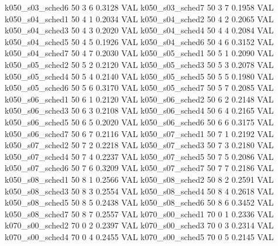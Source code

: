   k050_s03_sched6                   50    3   6    0.3128  VAL
  k050_s03_sched7                   50    3   7    0.1958  VAL
  k050_s04_sched1                   50    4   1    0.2034  VAL
  k050_s04_sched2                   50    4   2    0.2065  VAL
  k050_s04_sched3                   50    4   3    0.2020  VAL
  k050_s04_sched4                   50    4   4    0.2084  VAL
  k050_s04_sched5                   50    4   5    0.1926  VAL
  k050_s04_sched6                   50    4   6    0.3152  VAL
  k050_s04_sched7                   50    4   7    0.2030  VAL
  k050_s05_sched1                   50    5   1    0.2090  VAL
  k050_s05_sched2                   50    5   2    0.2120  VAL
  k050_s05_sched3                   50    5   3    0.2078  VAL
  k050_s05_sched4                   50    5   4    0.2140  VAL
  k050_s05_sched5                   50    5   5    0.1980  VAL
  k050_s05_sched6                   50    5   6    0.3170  VAL
  k050_s05_sched7                   50    5   7    0.2085  VAL
  k050_s06_sched1                   50    6   1    0.2120  VAL
  k050_s06_sched2                   50    6   2    0.2148  VAL
  k050_s06_sched3                   50    6   3    0.2108  VAL
  k050_s06_sched4                   50    6   4    0.2165  VAL
  k050_s06_sched5                   50    6   5    0.2020  VAL
  k050_s06_sched6                   50    6   6    0.3175  VAL
  k050_s06_sched7                   50    6   7    0.2116  VAL
  k050_s07_sched1                   50    7   1    0.2192  VAL
  k050_s07_sched2                   50    7   2    0.2218  VAL
  k050_s07_sched3                   50    7   3    0.2180  VAL
  k050_s07_sched4                   50    7   4    0.2237  VAL
  k050_s07_sched5                   50    7   5    0.2086  VAL
  k050_s07_sched6                   50    7   6    0.3209  VAL
  k050_s07_sched7                   50    7   7    0.2186  VAL
  k050_s08_sched1                   50    8   1    0.2566  VAL
  k050_s08_sched2                   50    8   2    0.2591  VAL
  k050_s08_sched3                   50    8   3    0.2554  VAL
  k050_s08_sched4                   50    8   4    0.2618  VAL
  k050_s08_sched5                   50    8   5    0.2438  VAL
  k050_s08_sched6                   50    8   6    0.3452  VAL
  k050_s08_sched7                   50    8   7    0.2557  VAL
  k070_s00_sched1                   70    0   1    0.2336  VAL
  k070_s00_sched2                   70    0   2    0.2397  VAL
  k070_s00_sched3                   70    0   3    0.2314  VAL
  k070_s00_sched4                   70    0   4    0.2455  VAL
  k070_s00_sched5                   70    0   5    0.2145  VAL
